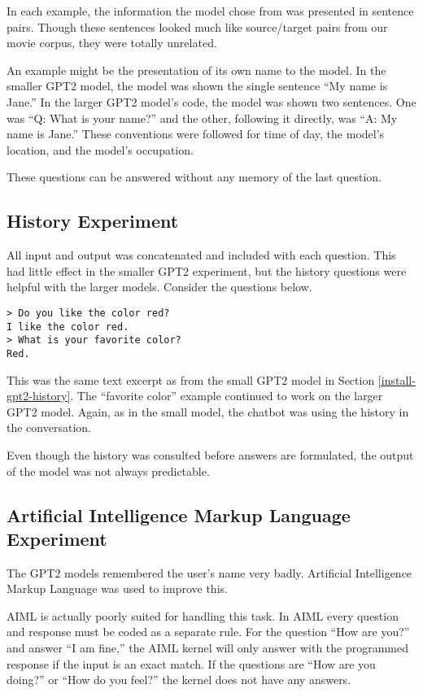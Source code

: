 In each example, the information the model chose from was presented in sentence pairs. Though these sentences looked much like source/target pairs from our movie corpus, they were totally unrelated.

An example might be the presentation of its own name to the model. In the smaller GPT2 model, the model was shown the single sentence ``My name is Jane.'' In the larger GPT2 model's code, the model was shown two sentences. One was ``Q: What is your name?'' and the other, following it directly, was ``A: My name is Jane.'' These conventions were followed for time of day, the model's location, and the model's occupation.

These questions can be answered without any memory of the last question.

\subsection{History Experiment}

All input and output was concatenated and included with each question. This had little effect in the smaller GPT2 experiment, but the history questions were helpful with the larger models. Consider the questions below.
\begin{verbatim}
> Do you like the color red?
I like the color red.
> What is your favorite color?
Red.
\end{verbatim}
This was the same text excerpt as from the small GPT2 model in Section \ref{install-gpt2-history}. The ``favorite color'' example continued to work on the larger GPT2 model. Again, as in the small model, the chatbot was using the history in the conversation. 

Even though the history was consulted before answers are formulated, the output of the model was not always predictable. %


\subsection{Artificial Intelligence Markup Language Experiment}


The GPT2 models remembered the user's name very badly. %
Artificial Intelligence Markup Language was used to improve this. 

AIML is actually poorly suited for handling this task. In AIML every question and response must be coded as a separate rule. For the question ``How are you?'' and answer ``I am fine,'' the AIML kernel will only answer with the programmed response if the input is an exact match. If the questions are ``How are you doing?'' or ``How do you feel?'' the kernel does not have any answers. %

